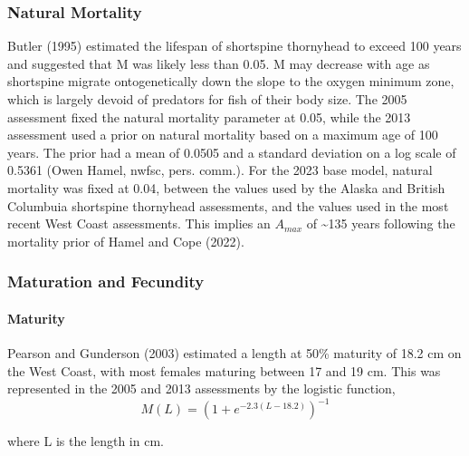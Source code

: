 \documentclass[11pt,
  letterpaper,
]{article}
\begin{document}
\hypertarget{natural-mortality}{%
\subsubsection{Natural Mortality}\label{natural-mortality}}

Butler (1995) estimated the lifespan of shortspine thornyhead to exceed 100 years and suggested that M was likely less than 0.05. M may decrease with age as shortspine migrate ontogenetically down the slope to the oxygen minimum zone, which is largely devoid of predators for fish of their body size. The 2005 assessment fixed the natural mortality parameter at 0.05, while the 2013 assessment used a prior on natural mortality based on a maximum age of 100 years. The prior had a mean of 0.0505 and a standard deviation on a log scale of 0.5361 (Owen Hamel, \gls{nwfsc}, pers. comm.). For the 2023 base model, natural mortality was fixed at 0.04, between the values used by the Alaska and British Columbuia shortspine thornyhead assessments, and the values used in the most recent West Coast assessments. This implies an \(A_{max}\) of \textasciitilde135 years following the mortality prior of Hamel and Cope (2022).

\hypertarget{maturation-and-fecundity}{%
\subsubsection{Maturation and Fecundity}\label{maturation-and-fecundity}}

\hypertarget{maturity}{%
\paragraph{Maturity}\label{maturity}}

Pearson and Gunderson (2003) estimated a length at 50\% maturity of 18.2 cm on the West Coast, with most females maturing between 17 and 19 cm. This was represented in the 2005 and 2013 assessments by the logistic function, \begin{equation} M(L) = (1 + e^{-2.3(L-18.2)})^{-1}\end{equation}

where L is the length in cm.
\end{document}
